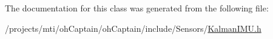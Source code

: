 The documentation for this class was generated from the following file\+:\begin{DoxyCompactItemize}
\item 
/projects/mti/oh\+Captain/oh\+Captain/include/\+Sensors/\hyperlink{_kalman_i_m_u_8h}{Kalman\+I\+M\+U.\+h}\end{DoxyCompactItemize}
